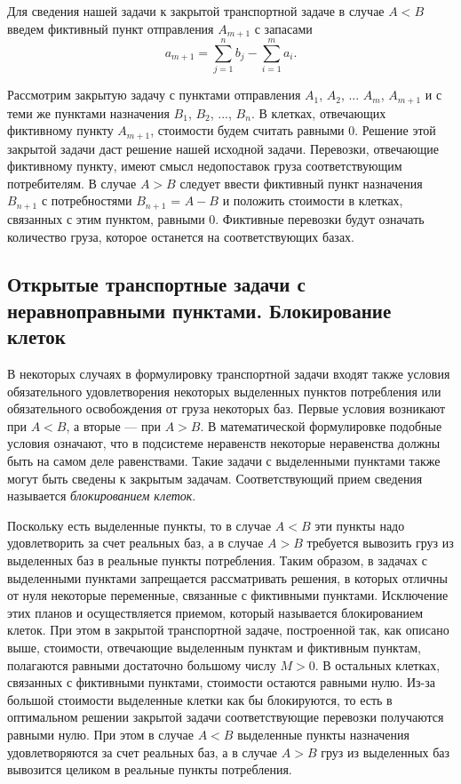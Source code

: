 Для сведения нашей  задачи к закрытой транспортной задаче в случае $A<B$ введем фиктивный пункт отправления  $A_{m+1}$ с запасами
\[a_{m+1} =\sum _{j=1}^{n}b_{j}  -\sum _{i=1}^{m}a_{i}  .\]

Рассмотрим закрытую задачу с пунктами отправления $A_{1}$, $A_{2}$, ... $A_{m}$, $A_{m+1}$  и с теми же пунктами назначения $B_{1}$, $B_{2}$, ..., $B_{n}$. В клетках, отвечающих  фиктивному пункту $A_{m+1}$, стоимости будем считать равными 0. Решение этой закрытой задачи даст решение нашей исходной задачи. Перевозки, отвечающие фиктивному пункту, имеют смысл недопоставок груза  соответствующим потребителям. В случае $A>B$ следует ввести фиктивный пункт назначения $B_{n+1}$  с потребностями $B_{n+1}$ = $A - B$ и положить стоимости в клетках, связанных с этим пунктом, равными 0. Фиктивные  перевозки будут означать количество груза, которое останется на соответствующих базах.

\subsection{Открытые транспортные задачи с неравноправными пунктами. Блокирование клеток}

В некоторых случаях в формулировку транспортной задачи входят также условия обязательного удовлетворения некоторых выделенных пунктов потребления или обязательного освобождения от груза  некоторых баз. Первые условия возникают при $A<B$, а вторые --- при $A>B$. В математической формулировке подобные условия означают, что в подсистеме  неравенств некоторые неравенства должны быть на самом деле равенствами. Такие задачи с выделенными пунктами также могут быть сведены к закрытым задачам. Соответствующий прием  сведения  называется \textit{блокированием клеток}.

Поскольку есть выделенные пункты, то в случае $A<B$ эти  пункты  надо удовлетворить за счет реальных баз, а в случае $A>B$ требуется вывозить груз из выделенных баз в реальные пункты потребления. Таким образом, в задачах с выделенными пунктами запрещается рассматривать решения, в которых отличны от нуля некоторые переменные, связанные с фиктивными пунктами. Исключение этих планов и осуществляется приемом, который называется блокированием клеток. При этом в закрытой транспортной задаче, построенной так, как описано выше, стоимости, отвечающие выделенным пунктам и фиктивным пунктам, полагаются  равными  достаточно большому числу $M>0$. В остальных клетках, связанных с  фиктивными пунктами, стоимости остаются равными нулю. Из-за  большой  стоимости выделенные клетки как бы блокируются, то есть в оптимальном решении закрытой задачи соответствующие перевозки получаются равными нулю. При этом в случае $A<B$ выделенные пункты назначения  удовлетворяются за счет реальных баз, а в случае $A>B$ груз из  выделенных  баз вывозится целиком в реальные пункты потребления.

